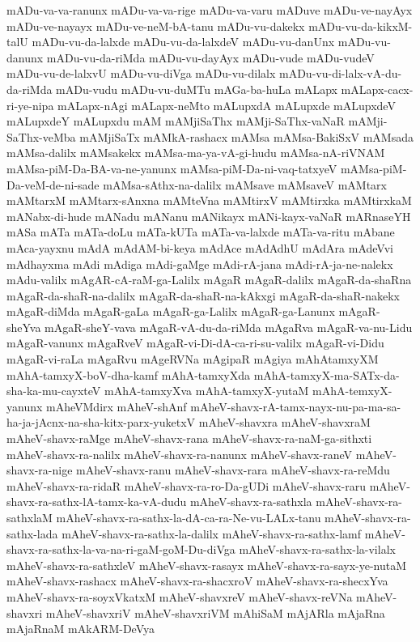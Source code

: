 {mADu-va-va-ranunx
mADu-va-va-rige
mADu-va-varu
mADuve
mADu-ve-nayAyx
mADu-ve-nayayx
mADu-ve-neM-bA-tanu
mADu-vu-dakekx
mADu-vu-da-kikxM-talU
mADu-vu-da-lalxde
mADu-vu-da-lalxdeV
mADu-vu-danUnx
mADu-vu-danunx
mADu-vu-da-riMda
mADu-vu-dayAyx
mADu-vude
mADu-vudeV
mADu-vu-de-lalxvU
mADu-vu-diVga
mADu-vu-dilalx
mADu-vu-di-lalx-vA-du-da-riMda
mADu-vudu
mADu-vu-duMTu
mAGa-ba-huLa
mALapx
mALapx-cacx-ri-ye-nipa
mALapx-nAgi
mALapx-neMto
mALupxdA
mALupxde
mALupxdeV
mALupxdeY
mALupxdu
mAM
mAMjiSaThx
mAMji-SaThx-vaNaR
mAMji-SaThx-veMba
mAMjiSaTx
mAMkA-rashacx
mAMsa
mAMsa-BakiSxV
mAMsada
mAMsa-dalilx
mAMsakekx
mAMsa-ma-ya-vA-gi-hudu
mAMsa-nA-riVNAM
mAMsa-piM-Da-BA-va-ne-yanunx
mAMsa-piM-Da-ni-vaq-tatxyeV
mAMsa-piM-Da-veM-de-ni-sade
mAMsa-sAthx-na-dalilx
mAMsave
mAMsaveV
mAMtarx
mAMtarxM
mAMtarx-sAnxna
mAMteVna
mAMtirxV
mAMtirxka
mAMtirxkaM
mANabx-di-hude
mANadu
mANanu
mANikayx
mANi-kayx-vaNaR
mARnaseYH
mASa
mATa
mATa-doLu
mATa-kUTa
mATa-va-lalxde
mATa-va-ritu
mAbane
mAca-yayxnu
mAdA
mAdAM-bi-keya
mAdAce
mAdAdhU
mAdAra
mAdeVvi
mAdhayxma
mAdi
mAdiga
mAdi-gaMge
mAdi-rA-jana
mAdi-rA-ja-ne-nalekx
mAdu-valilx
mAgAR-cA-raM-ga-Lalilx
mAgaR
mAgaR-dalilx
mAgaR-da-shaRna
mAgaR-da-shaR-na-dalilx
mAgaR-da-shaR-na-kAkxgi
mAgaR-da-shaR-nakekx
mAgaR-diMda
mAgaR-gaLa
mAgaR-ga-Lalilx
mAgaR-ga-Lanunx
mAgaR-sheYva
mAgaR-sheY-vava
mAgaR-vA-du-da-riMda
mAgaRva
mAgaR-va-nu-Lidu
mAgaR-vanunx
mAgaRveV
mAgaR-vi-Di-dA-ca-ri-su-valilx
mAgaR-vi-Didu
mAgaR-vi-raLa
mAgaRvu
mAgeRVNa
mAgipaR
mAgiya
mAhAtamxyXM
mAhA-tamxyX-boV-dha-kamf
mAhA-tamxyXda
mAhA-tamxyX-ma-SATx-da-sha-ka-mu-cayxteV
mAhA-tamxyXva
mAhA-tamxyX-yutaM
mAhA-temxyX-yanunx
mAheVMdirx
mAheV-shAnf
mAheV-shavx-rA-tamx-nayx-nu-pa-ma-sa-ha-ja-jAcnx-na-sha-kitx-parx-yuketxV
mAheV-shavxra
mAheV-shavxraM
mAheV-shavx-raMge
mAheV-shavx-rana
mAheV-shavx-ra-naM-ga-sithxti
mAheV-shavx-ra-nalilx
mAheV-shavx-ra-nanunx
mAheV-shavx-raneV
mAheV-shavx-ra-nige
mAheV-shavx-ranu
mAheV-shavx-rara
mAheV-shavx-ra-reMdu
mAheV-shavx-ra-ridaR
mAheV-shavx-ra-ro-Da-gUDi
mAheV-shavx-raru
mAheV-shavx-ra-sathx-lA-tamx-ka-vA-dudu
mAheV-shavx-ra-sathxla
mAheV-shavx-ra-sathxlaM
mAheV-shavx-ra-sathx-la-dA-ca-ra-Ne-vu-LALx-tanu
mAheV-shavx-ra-sathx-lada
mAheV-shavx-ra-sathx-la-dalilx
mAheV-shavx-ra-sathx-lamf
mAheV-shavx-ra-sathx-la-va-na-ri-gaM-goM-Du-diVga
mAheV-shavx-ra-sathx-la-vilalx
mAheV-shavx-ra-sathxleV
mAheV-shavx-rasayx
mAheV-shavx-ra-sayx-ye-nutaM
mAheV-shavx-rashacx
mAheV-shavx-ra-shacxroV
mAheV-shavx-ra-shecxYva
mAheV-shavx-ra-soyxVkatxM
mAheV-shavxreV
mAheV-shavx-reVNa
mAheV-shavxri
mAheV-shavxriV
mAheV-shavxriVM
mAhiSaM
mAjARla
mAjaRna
mAjaRnaM
mAkARM-DeVya
}
